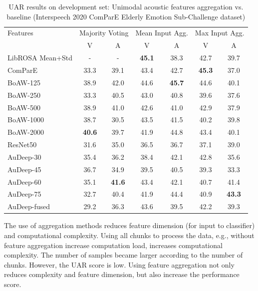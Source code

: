 \begin{table}
  \caption{UAR results on development set: Unimodal acoustic features aggregation
  vs. baseline \cite{Schuller} (Interspeech 2020 ComParE Elderly
  Emotion Sub-Challenge dataset)}
    \label{tab:acoustic_aggregation}
    \begin{center}
    \begin{tabular}{l c c c c c c}
    \hline 
Features  & \multicolumn{2}{c}{Majority Voting \cite{Schuller} } &
\multicolumn{2}{c}{Mean Input Agg.}      & \multicolumn{2}{c}{Max Input Agg.} \\
              & V & A & V & A & V & A \\   
      \hline \hline
      LibROSA Mean+Std  & - & - & \textbf{45.1}  & 38.3  & 42.7 & 39.7 \\
      ComParE & 33.3  &   39.1  & 43.4  & 42.7  & \textbf{45.3} & 37.0 \\
      BoAW-125  & 38.9  &   42.0& 44.6 & \textbf{45.7} & 44.6  & 40.1 \\
      BoAW-250  & 33.3  & 40.5  & 43.0  & 40.8  & 39.6  & 37.6 \\
      BoAW-500  & 38.9  & 41.0  & 42.6  & 41.0  & 42.9  & 37.9 \\
      BoAW-1000 & 38.7  & 30.5  & 43.5  & 41.5  & 40.2  & 39.8 \\
      BoAW-2000 & \textbf{40.6}  & 39.7  & 41.9  & 44.8  & 43.4  & 40.1 \\
      ResNet50  & 31.6  & 35.0  & 36.5  & 36.7  & 37.1  & 39.0 \\
      AuDeep-30 & 35.4  & 36.2  & 38.4  & 42.1  & 42.8  & 35.6 \\
      AuDeep-45 & 36.7  & 34.9  & 39.5  & 40.5  & 39.3  & 33.3 \\
      AuDeep-60 & 35.1  & \textbf{41.6}  & 43.4  & 42.1  & 40.7  & 41.4 \\
      AuDeep-75 & 32.7  & 40.4  & 41.9  & 44.4  & 40.9  & \textbf{43.3} \\
      AuDeep-fused  & 29.2  & 36.3  & 43.6  & 39.5  & 42.2  & 39.3 \\
    \hline
    \end{tabular}
  \end{center}
  \end{table}

The use of aggregation methods reduces feature dimension (for input to
classifier) and computational complexity. Using all chunks to process the data,
e.g., without feature aggregation increase computation load, increases
computational complexity. The number of samples became larger according to the
number of chunks. However, the UAR score is low. Using feature aggregation not
only reduces complexity and feature dimension, but also increase the
performance score.

